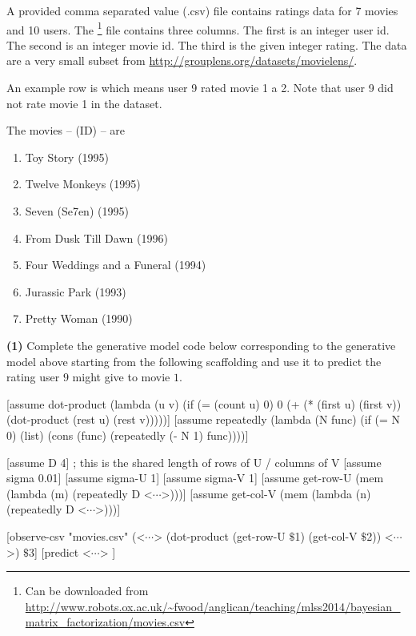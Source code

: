 \documentclass[11pt,reqno]{amsart}
\newcommand{\+}[1]{\ensuremath{{\mathbf{#1}}}}
\begin{document}
A provided comma separated value  (.csv) file contains ratings data for 7 movies and 10 users.  The \footnote{Can be downloaded from \url{http://www.robots.ox.ac.uk/~fwood/anglican/teaching/mlss2014/bayesian_matrix_factorization/movies.csv}} file contains three columns.  The first is an integer user id.  The second is an integer movie id.  The third is the given integer rating. The data are a very small subset from \url{http://grouplens.org/datasets/movielens/}.

An example row is  which means user 9 rated movie 1 a 2.  Note that user 9 did not rate movie 1 in the dataset.

The movies -- (ID) -- are

\begin{enumerate}
\item Toy Story (1995)
\item Twelve Monkeys (1995)
\item Seven (Se7en) (1995)
\item From Dusk Till Dawn (1996)
\item Four Weddings and a Funeral (1994)
\item Jurassic Park (1993)
\item Pretty Woman (1990)
\end{enumerate}


\vspace{.5cm}

\vspace{.5cm}

{\bf (1)} Complete the generative model code below corresponding to the generative model above starting from the following scaffolding and use it to predict the rating user $9$ might give to movie $1$.

\begin{code}{}{}
[assume dot-product (lambda (u v) 
                      (if (= (count u) 0) 0 
                          (+ (* (first u) (first v)) 
                             (dot-product (rest u) (rest v)))))]
[assume repeatedly (lambda (N func)
    (if (= N 0)
        (list)
        (cons (func) (repeatedly (- N 1) func))))]

[assume D 4] ; this is the shared length of rows of U / columns of V 
[assume sigma 0.01]
[assume sigma-U 1]
[assume sigma-V 1]
[assume get-row-U 
    (mem (lambda (m) (repeatedly D <$\cdots$>)))]
[assume get-col-V 
    (mem (lambda (n) (repeatedly D <$\cdots$>)))]

[observe-csv "movies.csv" 
     (<$\cdots$> (dot-product (get-row-U $\$$1) (get-col-V $\$$2)) <$\cdots$>) $\$$3]
[predict <$\cdots$> ]
\end{code}
\end{document}
